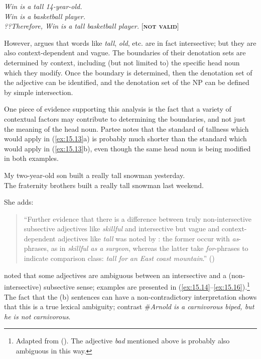 \ea \label{ex:15.12}
\textit{Win is a tall 14-year-old.}\\
\textit{Win is a basketball player.\\
\FelixHRule
??Therefore, Win is a tall basketball player.}   [\textbf{\textsc{not valid}}]
\z


However, \citet{Siegel1976} argues that words like \textit{tall}, \textit{old}, etc. are in fact intersective; but they are also context-dependent and vague. The boundaries of their denotation sets are determined by context, including (but not limited to) the specific head noun which they modify. Once the boundary is determined, then the denotation set of the adjective can be identified, and the denotation set of the NP can be defined by simple intersection.



One piece of evidence supporting this analysis is the fact that a variety of contextual factors may contribute to determining the boundaries, and not just the meaning of the head noun. Partee notes that the standard of tallness which would apply in (\ref{ex:15.13}a) is probably much shorter than the standard which would apply in (\ref{ex:15.13}b), even though the same head noun is being modified in both examples.


\ea \label{ex:15.13}
\ea  My two-year-old son built a really tall snowman yesterday.\\
\ex The fraternity brothers built a really tall snowman last weekend.
                       \z
\z


She adds:
\begin{quote}
“Further evidence that there is a difference between truly non-intersective subsective adjectives like \textit{skillful} and intersective but vague and context-dependent adjectives like \textit{tall} was noted by \citet{Siegel1976}: the former occur with \textit{as}-phrases, as in \textit{skillful as a surgeon}, whereas the latter take \textit{for}-phrases to indicate comparison class: \textit{tall for an East coast mountain}.” (\citealt{Partee2007})
\end{quote}


\citet{Bolinger1967} noted that some adjectives are ambiguous between an intersective and a (non-intersective) subsective sense; examples are presented in (\ref{ex:15.14}--\ref{ex:15.16}).\footnote{Adapted from \citealt{Morzycki2013} (). The adjective \textit{bad} mentioned above is probably also ambiguous in this way.} The fact that the (b) sentences can have a non-contradictory interpretation shows that this is a true lexical ambiguity; contrast \#\textit{Arnold is a carnivorous biped, but he is not carnivorous}.


